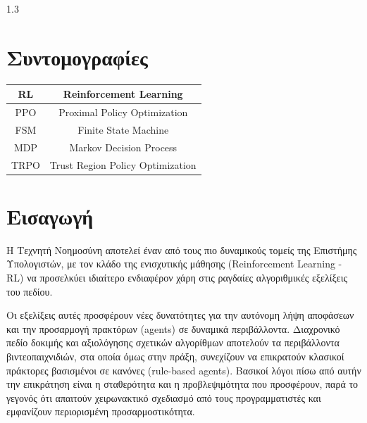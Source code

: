 \documentclass[12pt]{article}
\begin{document}


\renewcommand{\contentsname}{Πίνακας περιεχομένων}
\pagebreak
\begin{spacing}{1.3}
\tableofcontents
\end{spacing}

\pagebreak


\renewcommand{\listfigurename}{Κατάλογος εικόνων}
\pagebreak
\listoffigures

\pagebreak
\listoftables 

\pagebreak
\section*{Συντομογραφίες}
\begin{table}[ht]
\centering
\begin{tabular}{| c | c |}
\hline
RL    & Reinforcement Learning \\
\hline
PPO     & Proximal Policy Optimization \\
\hline
FSM     & Finite State Machine \\
\hline
MDP     & Markov Decision Process \\
\hline
TRPO    & Trust Region Policy Optimization \\
\hline
\end{tabular}
\end{table}

\pagebreak
\section{Εισαγωγή}
Η Τεχνητή Νοημοσύνη αποτελεί έναν από τους πιο δυναμικούς τομείς της Επιστήμης Υπολογιστών, με τον κλάδο της ενισχυτικής μάθησης (Reinforcement Learning - RL) να προσελκύει ιδιαίτερο ενδιαφέρον χάρη στις ραγδαίες αλγοριθμικές εξελίξεις του πεδίου. 

Οι εξελίξεις αυτές προσφέρουν νέες δυνατότητες για την αυτόνομη λήψη αποφάσεων και την προσαρμογή πρακτόρων (\foreignlanguage{english}{agents}) σε δυναμικά περιβάλλοντα. Διαχρονικό πεδίο δοκιμής και αξιολόγησης σχετικών αλγορίθμων αποτελούν τα περιβάλλοντα βιντεοπαιχνιδιών, στα οποία όμως στην πράξη, συνεχίζουν να επικρατούν κλασικοί πράκτορες βασισμένοι σε κανόνες (rule-based agents). Βασικοί λόγοι πίσω από αυτήν την επικράτηση είναι η σταθερότητα και η προβλεψιμότητα που προσφέρουν, παρά το γεγονός ότι απαιτούν χειρωνακτικό σχεδιασμό από τους προγραμματιστές και εμφανίζουν περιορισμένη προσαρμοστικότητα.
\end{document}
